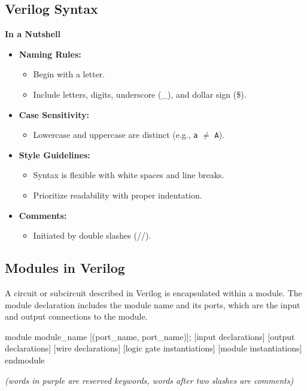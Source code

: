 \documentclass[12pt,openany, tikz,border=10pt]{book}
\begin{document}
			      	\subsection{Verilog Syntax}
			      	\textbf{In a Nutshell}
			      	\begin{itemize}
			      		\item[] \textbf{Naming Rules:}
			      		      \begin{itemize}
			      		      	\item[] Begin with a letter.
			      		      	\item[] Include letters, digits, underscore (\_), and dollar sign (\$).
			      		      \end{itemize}
			      		        
			      		\item[] \textbf{Case Sensitivity:}
			      		      \begin{itemize}
			      		      	\item[] Lowercase and uppercase are distinct (e.g., \texttt{a} $\neq$ \texttt{A}).
			      		      \end{itemize}
			      		        
			      		\item[] \textbf{Style Guidelines:}
			      		      \begin{itemize}
			      		      	\item[] Syntax is flexible with white spaces and line breaks.
			      		      	\item[] Prioritize readability with proper indentation.
			      		      \end{itemize}
			      		        
			      		\item[] \textbf{Comments:}
			      		      \begin{itemize}
			      		      	\item[] Initiated by double slashes (//).
			      		      \end{itemize}
			      	\end{itemize}

			      	\subsection{Modules in Verilog}
			      	A circuit or subcircuit described in Verilog is encapsulated within a module. The module declaration includes the module name and its ports, which are the input and output connections to the module.
			      	\begin{vhdl}
module module_name [(port_name{, port_name})];
[input declarations]
[output declarations]
[wire declarations]
[logic gate instantiations]
[module instantiations]
endmodule
			      	\end{vhdl}
			      	\textit{(words in purple are reserved keywords, words after two slashes are comments)} 
			  
\end{document}
